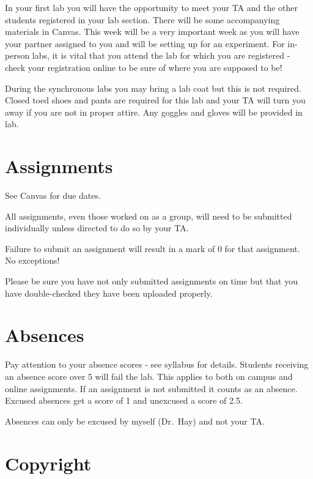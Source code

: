 \documentclass[
]{book}
\begin{document}
In your first lab you will have the opportunity to meet your TA and the other students registered in your lab section. There will be some accompanying materials in Canvas. This week will be a very important week as you will have your partner assigned to you and will be setting up for an experiment. For in-person labs, it is vital that you attend the lab for which you are registered - check your registration online to be sure of where you are supposed to be!

During the synchronous labs you may bring a lab coat but this is not required. Closed toed shoes and pants are required for this lab and your TA will turn you away if you are not in proper attire. Any goggles and gloves will be provided in lab.

\hypertarget{assignments}{%
\section*{Assignments}\label{assignments}}

See Canvas for due dates.

All assignments, even those worked on as a group, will need to be submitted individually unless directed to do so by your TA.

Failure to submit an assignment will result in a mark of 0 for that assignment. No exceptions!

Please be sure you have not only submitted assignments on time but that you have double-checked they have been uploaded properly.

\hypertarget{absences}{%
\section*{Absences}\label{absences}}

Pay attention to your absence scores - see syllabus for details. Students receiving an absence score over 5 will fail the lab. This applies to both on campus and online assignments. If an assignment is not submitted it counts as an absence. Excused absences get a score of 1 and unexcused a score of 2.5.

Absences can only be excused by myself (Dr.~Hay) and not your TA.

\hypertarget{copyright}{%
\section*{Copyright}\label{copyright}}
\end{document}
